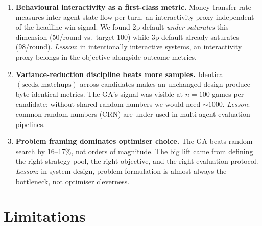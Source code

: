 \documentclass[10pt]{article}
\begin{document}
\begin{enumerate}[leftmargin=1.2em,itemsep=2pt]
\item \textbf{Behavioural interactivity as a first-class metric.}
Money-transfer rate measures inter-agent state flow per turn, an
interactivity proxy independent of the headline win signal. We found 2p
default \emph{under-saturates} this dimension (50/round vs.\ target 100)
while 3p default already saturates (98/round). \emph{Lesson}: in
intentionally interactive systems, an interactivity proxy belongs in
the objective alongside outcome metrics.

\item \textbf{Variance-reduction discipline beats more samples.} Identical
$(\text{seeds},\text{matchups})$ across candidates makes an unchanged
design produce byte-identical metrics. The GA's signal was visible at
$n{=}100$ games per candidate; without shared random numbers we would
need $\sim 1000$. \emph{Lesson}: common random numbers (CRN) are
under-used in multi-agent evaluation pipelines.

\item \textbf{Problem framing dominates optimiser choice.} The GA beats
random search by 16--17\%, not orders of magnitude. The big lift came
from defining the right strategy pool, the right objective, and the
right evaluation protocol. \emph{Lesson}: in system design, problem
formulation is almost always the bottleneck, not optimiser cleverness.
\end{enumerate}

\section{Limitations}
\end{document}
